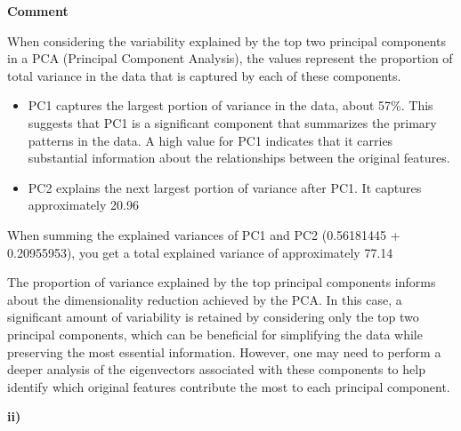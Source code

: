 \documentclass{article}
\begin{document}
\textbf{Comment}

When considering the variability explained by the top two principal components in a PCA (Principal Component Analysis), the values represent the proportion of total variance in the data that is captured by each of these components.
\begin{itemize}
  \item PC1 captures the largest portion of variance in the data, about 57\%. This suggests that PC1 is a significant component that summarizes the primary patterns in the data. A high value for PC1 indicates that it carries substantial information about the relationships between the original features.
  \item PC2 explains the next largest portion of variance after PC1. It captures approximately 20.96%
\end{itemize}
When summing the explained variances of PC1 and PC2 (0.56181445 + 0.20955953), you get a total explained variance of approximately 77.14%

The proportion of variance explained by the top principal components informs about the dimensionality reduction achieved by the PCA. In this case, a significant amount of variability is retained by considering only the top two principal components, which can be beneficial for simplifying the data while preserving the most essential information.
However, one may need to perform a deeper analysis of the eigenvectors associated with these components to help identify which original features contribute the most to each principal component.


\textbf{ii)}
\end{document}
